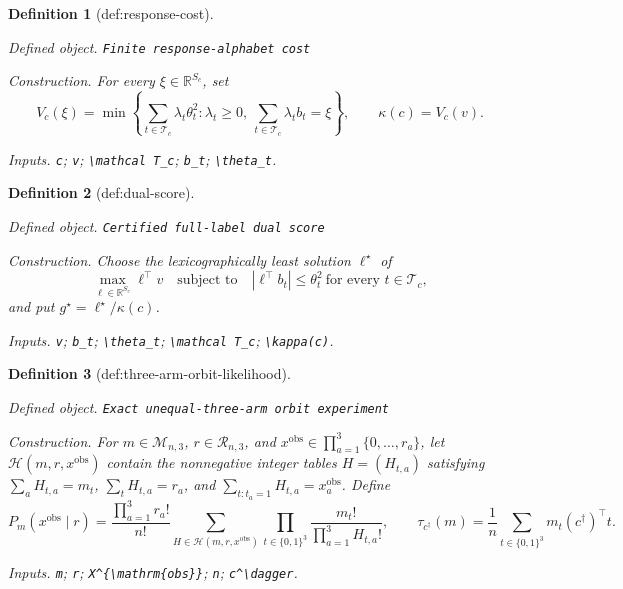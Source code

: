 \documentclass{article}
\newtheorem{definition}{Definition}
\begin{document}
\begin{definition}[def:response-cost]\label{def:response-cost}
\par\smallskip\noindent\emph{Defined object.} \texttt{Finite response-\allowbreak{}alphabet cost}
\par\smallskip\noindent\emph{Construction.} For every \(\xi\in\mathbb R^{S_c}\), set \[V_c(\xi)=\min\left\{\sum_{t\in\mathcal T_c}\lambda_t\theta_t^2:\lambda_t\ge0,\ \sum_{t\in\mathcal T_c}\lambda_tb_t=\xi\right\},\qquad \kappa(c)=V_c(v).\]
\par\smallskip\noindent\emph{Inputs.} \texttt{c}; \texttt{v}; \texttt{\textbackslash{}\allowbreak{}mathcal T\_\allowbreak{}c}; \texttt{b\_\allowbreak{}t}; \texttt{\textbackslash{}\allowbreak{}theta\_\allowbreak{}t}.
\end{definition}

\begin{definition}[def:dual-score]\label{def:dual-score}
\par\smallskip\noindent\emph{Defined object.} \texttt{Certified full-\allowbreak{}label dual score}
\par\smallskip\noindent\emph{Construction.} Choose the lexicographically least solution \(\ell^\star\) of \[\max_{\ell\in\mathbb R^{S_c}}\ell^\top v\quad\text{subject to}\quad |\ell^\top b_t|\le\theta_t^2\ \text{for every }t\in\mathcal T_c,\] and put \(g^\star=\ell^\star/\kappa(c)\).
\par\smallskip\noindent\emph{Inputs.} \texttt{v}; \texttt{b\_\allowbreak{}t}; \texttt{\textbackslash{}\allowbreak{}theta\_\allowbreak{}t}; \texttt{\textbackslash{}\allowbreak{}mathcal T\_\allowbreak{}c}; \texttt{\textbackslash{}\allowbreak{}kappa(c)}.
\end{definition}

\begin{definition}[def:three-arm-orbit-likelihood]\label{def:three-arm-orbit-likelihood}
\par\smallskip\noindent\emph{Defined object.} \texttt{Exact unequal-\allowbreak{}three-\allowbreak{}arm orbit experiment}
\par\smallskip\noindent\emph{Construction.} For \(m\in\mathcal M_{n,3}\), \(r\in\mathcal R_{n,3}\), and \(x^{\mathrm{obs}}\in\prod_{a=1}^3\{0,\ldots,r_a\}\), let \(\mathcal H(m,r,x^{\mathrm{obs}})\) contain the nonnegative integer tables \(H=(H_{t,a})\) satisfying \(\sum_aH_{t,a}=m_t\), \(\sum_tH_{t,a}=r_a\), and \(\sum_{t:t_a=1}H_{t,a}=x_a^{\mathrm{obs}}\). Define \[P_m(x^{\mathrm{obs}}\mid r)=\frac{\prod_{a=1}^3r_a!}{n!}\sum_{H\in\mathcal H(m,r,x^{\mathrm{obs}})}\prod_{t\in\{0,1\}^3}\frac{m_t!}{\prod_{a=1}^3H_{t,a}!},\qquad \tau_{c^\dagger}(m)=\frac1n\sum_{t\in\{0,1\}^3}m_t(c^\dagger)^\top t.\]
\par\smallskip\noindent\emph{Inputs.} \texttt{m}; \texttt{r}; \texttt{X\textasciicircum{}\{\textbackslash{}\allowbreak{}mathrm\{obs\}\allowbreak{}\}\allowbreak{}}; \texttt{n}; \texttt{c\textasciicircum{}\textbackslash{}\allowbreak{}dagger}.
\end{definition}
\end{document}
